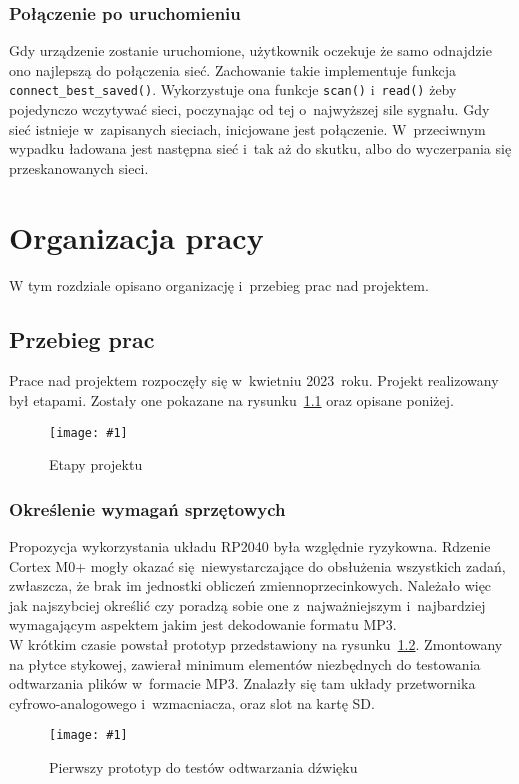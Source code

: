 \documentclass[polish]{aghengthesis}
\newcommand{\imgint}[4]{
	\begin{figure}[{#4}]
		\centering
		\texttt{[image: \#1]}
		\caption{#2}
		\label{#1}
	\end{figure}
}
\newcommand{\imgh}[3]{\imgint{#1}{#2}{#3}{H}}
\begin{document}
		\subsection{Połączenie po uruchomieniu}
			Gdy urządzenie zostanie uruchomione, użytkownik oczekuje że samo odnajdzie ono najlepszą do połączenia sieć. Zachowanie takie implementuje funkcja \lstinline|connect_best_saved()|. Wykorzystuje ona funkcje \lstinline|scan()| i~\lstinline|read()| żeby pojedynczo wczytywać sieci, poczynając od tej o~najwyższej sile sygnału. Gdy sieć istnieje w~zapisanych sieciach, inicjowane jest połączenie. W~przeciwnym wypadku ładowana jest następna sieć i~tak aż do skutku, albo do wyczerpania się przeskanowanych sieci.
			
\chapter{Organizacja pracy}
	W tym rozdziale opisano organizację i~przebieg prac nad projektem.
	
	\section{Przebieg prac}
		Prace nad projektem rozpoczęły się w~kwietniu 2023~roku. Projekt realizowany był etapami. Zostały one pokazane na rysunku~\ref{4/PicoRadio-steps} oraz opisane poniżej.
		
		\imgh{4/PicoRadio-steps}{Etapy projektu}{1}
		
		\subsection{Określenie wymagań sprzętowych}
			Propozycja wykorzystania układu RP2040 była względnie ryzykowna. Rdzenie Cortex M0+ mogły okazać się niewystarczające do obsłużenia wszystkich zadań, zwłaszcza, że brak im jednostki obliczeń zmiennoprzecinkowych. Należało więc jak najszybciej określić czy poradzą sobie one z~najważniejszym i~najbardziej wymagającym aspektem jakim jest dekodowanie formatu MP3.
			$ $\\
			
			W krótkim czasie powstał prototyp przedstawiony na rysunku~\ref{4/prototype_1}. Zmontowany na płytce stykowej, zawierał minimum elementów niezbędnych do testowania odtwarzania plików w~formacie MP3. Znalazły się tam układy przetwornika cyfrowo-analogowego i~wzmacniacza, oraz slot na kartę SD.
			
			\imgh{4/prototype_1}{Pierwszy prototyp do testów odtwarzania dźwięku}{0.6}
			
\end{document}
